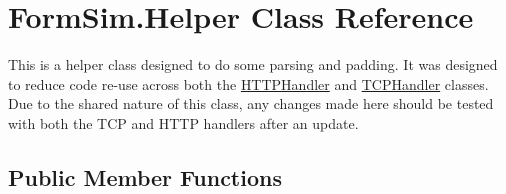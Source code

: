 \hypertarget{class_form_sim_1_1_helper}{}\section{Form\+Sim.\+Helper Class Reference}
\label{class_form_sim_1_1_helper}


This is a helper class designed to do some parsing and padding. It was designed to reduce code re-\/use across both the \mbox{\hyperlink{class_form_sim_1_1_h_t_t_p_handler}{H\+T\+T\+P\+Handler}} and \mbox{\hyperlink{class_form_sim_1_1_t_c_p_handler}{T\+C\+P\+Handler}} classes. Due to the shared nature of this class, any changes made here should be tested with both the T\+CP and H\+T\+TP handlers after an update.  


\subsection*{Public Member Functions}
